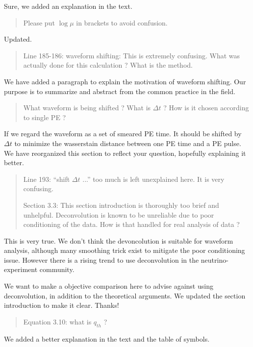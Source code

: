 \documentclass[12pt]{article}
\begin{document}
Sure, we added an explanation in the text.

\begin{quote}
Please put $\log\mu$ in brackets to avoid confusion.
\end{quote}

Updated.

\begin{quote}
Line 185-186: waveform shifting: This is extremely confusing. What was actually done for this calculation ? What is the method. 
\end{quote}

We have added a paragraph to explain the motivation of waveform shifting.  Our purpose is to summarize and abstract from the common practice in the field. 

\begin{quote}
What waveform is being shifted ? What is $\Delta t$ ? How is it chosen according to single PE ?
\end{quote}

If we regard the waveform as a set of smeared PE time. It should be shifted by $\Delta t$ to minimize the wasserstain distance between one PE time and a PE pulse. We have reorganized this section to reflect your question, hopefully explaining it better.

\begin{quote}
Line 193: ``shift $\Delta t$ ...'' too much is left unexplained here. It is very confusing.

Section 3.3: This section introduction is thoroughly too brief and unhelpful. Deconvolution is known to be unreliable due to poor conditioning of the data. How is that handled for real analysis of data ?
\end{quote}

This is very true.  We don't think the devoncolution is suitable for waveform analysis, although many smoothing trick exist to mitigate the poor conditioning issue.  However there is a rising trend to use deconvolution in the neutrino-experiment community.

We want to make a objective comparison here to advise against using deconvolution, in addition to the theoretical arguments.  We updated the section introduction to make it clear.  Thanks!

\begin{quote}
Equation 3.10: what is $q_{th}$ ?
\end{quote}

We added a better explanation in the text and the table of symbols.
\end{document}
